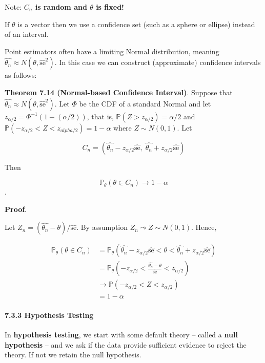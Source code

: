 Note: \textbf{\(C_n\) is random and \(\theta\) is fixed!}

If \(\theta\) is a vector then we use a confidence set (such as a sphere
or ellipse) instead of an interval.

Point estimators often have a limiting Normal distribution, meaning
\(\hat{\theta_n} \approx N(\theta, \hat{\text{se}}^2)\). In this case we
can construct (approximate) confidence intervals as follows:

\textbf{Theorem 7.14 (Normal-based Confidence Interval)}. Suppose that
\(\hat{\theta_n} \approx N(\theta, \hat{\text{se}}^2)\). Let \(\Phi\) be
the CDF of a standard Normal and let
\(z_{\alpha/2} = \Phi^{-1}\left(1 - (\alpha / 2)\right)\), that is,
\(\mathbb{P}(Z > z_{\alpha/2}) = \alpha/2\) and
\(\mathbb{P}(-z_{\alpha/2} < Z < z_{alpha/2}) = 1 - \alpha\) where
\(Z \sim N(0, 1)\). Let

\[ C_n = \left(\hat{\theta_n} - z_{\alpha/2} \hat{\text{se}}, \; \hat{\theta_n} + z_{\alpha/2} \hat{\text{se}}\right) \]

Then

\[ \mathbb{P}_\theta(\theta \in C_n) \rightarrow 1 - \alpha \].

\textbf{Proof}.

Let \(Z_n = (\hat{\theta_n} - \theta) / \hat{\text{se}}\). By assumption
\(Z_n \leadsto Z \sim N(0, 1)\). Hence,

\begin{align}
\mathbb{P}_\theta(\theta \in C_n) 
& = \mathbb{P}_\theta \left(\hat{\theta_n} - z_{\alpha/2} \hat{\text{se}} < \theta < \hat{\theta_n} + z_{\alpha/2} \hat{\text{se}} \right) \\
& = \mathbb{P}_\theta \left(-z_{\alpha/2} < \frac{\hat{\theta_n} - \theta}{\hat{\text{se}}} < z_{\alpha/2} \right) \\
& \rightarrow \mathbb{P}\left(-z_{\alpha/2} < Z < z_{\alpha/2}\right) \\
&= 1 - \alpha
\end{align}

\paragraph{7.3.3 Hypothesis Testing}\label{hypothesis-testing}

In \textbf{hypothesis testing}, we start with some default theory --
called a \textbf{null hypothesis} -- and we ask if the data provide
sufficient evidence to reject the theory. If not we retain the null
hypothesis.

